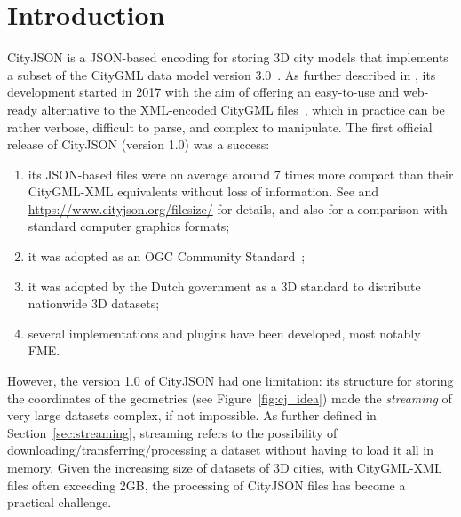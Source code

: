\documentclass{isprs} %
\begin{document}
\maketitle


\sloppy


%
\section{Introduction}%
\label{sec:intro}
 
CityJSON is a JSON-based encoding for storing 3D city models that implements a subset of the CityGML data model version 3.0~\citep{OGC-CityGML3}.
As further described in \citet{19_ogdss_cityjson}, its development started in 2017 with the aim of offering an easy-to-use and web-ready alternative to the XML-encoded CityGML files~\citep{OGC-CityGML3-XML}, which in practice can be rather verbose, difficult to parse, and complex to manipulate.
The first official release of CityJSON (version 1.0) was a success: 
\begin{enumerate}
  \item its JSON-based files were on average around 7 times more compact than their CityGML-XML equivalents without loss of information. See \citet{19_ogdss_cityjson} and \url{https://www.cityjson.org/filesize/} for details, and also \citet{Praschl23} for a comparison with standard computer graphics formats; 
  \item it was adopted as an OGC Community Standard~\citep{OGC-CityJSON-v10}; 
  \item it was adopted by the Dutch government as a 3D standard to distribute nationwide 3D datasets; 
  \item several implementations and plugins have been developed, most notably FME\@.
\end{enumerate}



%

However, the version 1.0 of CityJSON had one limitation: its structure for storing the coordinates of the geometries (see Figure~\ref{fig:cj_idea}) made the \emph{streaming} of very large datasets complex, if not impossible.
As further defined in Section~\ref{sec:streaming}, streaming refers to the possibility of downloading/transferring/processing a dataset without having to load it all in memory.
Given the increasing size of datasets of 3D cities, with CityGML-XML files often exceeding 2GB, the processing of CityJSON files has become a practical challenge.
\end{document}
